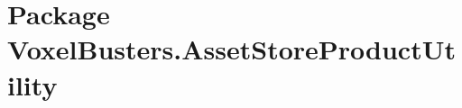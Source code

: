 \hypertarget{namespace_voxel_busters_1_1_asset_store_product_utility}{}\section{Package Voxel\+Busters.\+Asset\+Store\+Product\+Utility}
\label{namespace_voxel_busters_1_1_asset_store_product_utility}
